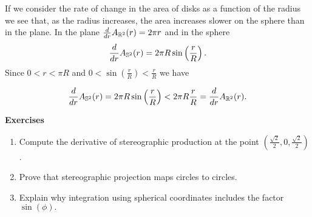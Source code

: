 If we consider the rate of change in the area of disks as a function of the radius
we see that, as the radius increases, the area increases slower on the sphere
than in the plane. 
In the plane $\frac{d}{dr}A_{\mathbb{R}^2}(r) =2\pi r$ and in the sphere
$$\frac{d}{dr}A_{\mathbb{S}^2}(r)=2\pi R\sin \left(\frac{r}{R}\right).$$
Since $0<r<\pi R$ and $0<\sin\left(\frac{r}{R}\right)< \frac{r}{R}$ we have

$$\frac{d}{dr}A_{\mathbb{S}^2}(r)=2\pi R\sin \left(\frac{r}{R}\right)<2\pi R \frac{r}{R}=\frac{d}{dr}A_{\mathbb{R}^2}(r).$$


\noindent \textbf{Exercises}


\begin{enumerate}
	\item Compute the derivative of stereographic production at the point $(\frac{\sqrt{2}}{2},0,\frac{\sqrt{2}}{2})$.
	
	\item Prove that stereographic projection maps circles to circles.
	
	\item Explain why integration using spherical coordinates includes the factor $\sin(\phi).$
	
\end{enumerate}

\pagebreak